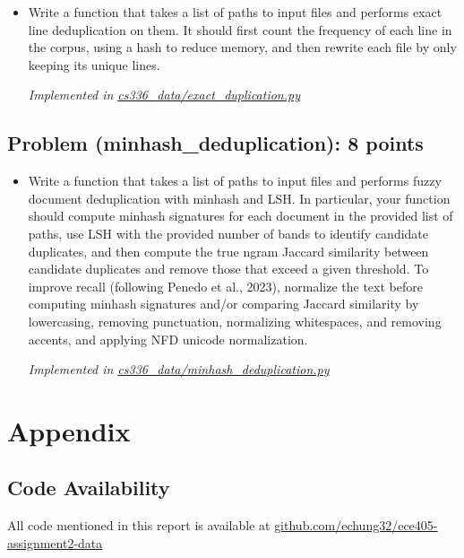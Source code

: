 \documentclass[letterpaper]{article}
\begin{document}
\begin{itemize}
	\item[(a)] Write a function that takes a list of paths to input files and performs exact line deduplication on them. It should first count the frequency of each line in the corpus, using a hash to reduce memory, and then rewrite each file by only keeping its unique lines.

	\textit{Implemented in  \href{https://github.com/echung32/ece405-assignment2-data/blob/main/cs336_data/exact_duplication.py}{cs336\_data/exact\_duplication.py}}

\end{itemize}


\subsection{Problem (minhash\_deduplication): 8 points}

\begin{itemize}
	\item[(a)] Write a function that takes a list of paths to input files and performs fuzzy document deduplication with minhash and LSH. In particular, your function should compute minhash signatures for each	document in the provided list of paths, use LSH with the provided number of bands to identify candidate	duplicates, and then compute the true ngram Jaccard similarity between candidate duplicates and remove those that exceed a given threshold. To improve recall (following Penedo et al., 2023), normalize	the text before computing minhash signatures and/or comparing Jaccard similarity by lowercasing, removing punctuation, normalizing whitespaces, and removing accents, and applying NFD unicode normalization.

	\textit{Implemented in  \href{https://github.com/echung32/ece405-assignment2-data/blob/main/cs336_data/minhash\_deduplication.py}{cs336\_data/minhash\_deduplication.py}}

\end{itemize}

\appendix

\section{Appendix}

\subsection{Code Availability}

All code mentioned in this report is available at \href{https://github.com/echung32/ece405-assignment2-data}{github.com/echung32/ece405-assignment2-data}
\end{document}
